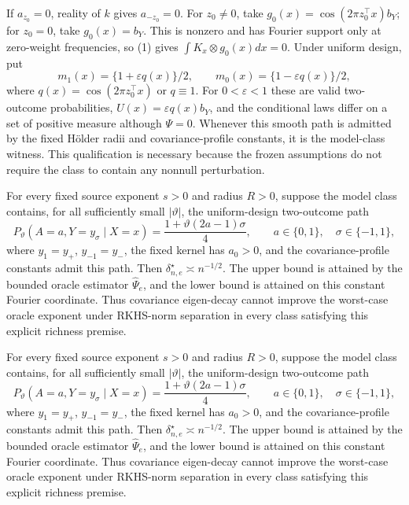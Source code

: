 If \(a_{z_0}=0\), reality of \(k\) gives \(a_{-z_0}=0\). For \(z_0\ne0\), take \(g_0(x)=\cos(2\pi z_0^\top x)b_Y\); for \(z_0=0\), take \(g_0(x)=b_Y\). This is nonzero and has Fourier support only at zero-weight frequencies, so (1) gives \(\int K_x\otimes g_0(x)dx=0\). Under uniform design, put
\[
m_1(x)=\{1+\varepsilon q(x)\}/2,\qquad
m_0(x)=\{1-\varepsilon q(x)\}/2,
\]
where \(q(x)=\cos(2\pi z_0^\top x)\) or \(q\equiv1\). For \(0<\varepsilon<1\) these are valid two-outcome probabilities, \(U(x)=\varepsilon q(x)b_Y\), and the conditional laws differ on a set of positive measure although \(\Psi=0\). Whenever this smooth path is admitted by the fixed Hölder radii and covariance-profile constants, it is the model-class witness. This qualification is necessary because the frozen assumptions do not require the class to contain any nonnull perturbation.

For every fixed source exponent \(s>0\) and radius \(R>0\), suppose the model class contains, for all sufficiently small \(|\vartheta|\), the uniform-design two-outcome path
\[
P_\vartheta(A=a,Y=y_\sigma\mid X=x)
=\frac{1+\vartheta(2a-1)\sigma}{4},
\qquad a\in\{0,1\},\quad \sigma\in\{-1,1\},
\]
where \(y_1=y_+\), \(y_{-1}=y_-\), the fixed kernel has \(a_0>0\), and the covariance-profile constants admit this path. Then \(\delta_{n,e}^\star\asymp n^{-1/2}\). The upper bound is attained by the bounded oracle estimator \(\widehat\Psi_e\), and the lower bound is attained on this constant Fourier coordinate. Thus covariance eigen-decay cannot improve the worst-case oracle exponent under RKHS-norm separation in every class satisfying this explicit richness premise.

For every fixed source exponent \(s>0\) and radius \(R>0\), suppose the model class contains, for all sufficiently small \(|\vartheta|\), the uniform-design two-outcome path
\[
P_\vartheta(A=a,Y=y_\sigma\mid X=x)
=\frac{1+\vartheta(2a-1)\sigma}{4},
\qquad a\in\{0,1\},\quad \sigma\in\{-1,1\},
\]
where \(y_1=y_+\), \(y_{-1}=y_-\), the fixed kernel has \(a_0>0\), and the covariance-profile constants admit this path. Then \(\delta_{n,e}^\star\asymp n^{-1/2}\). The upper bound is attained by the bounded oracle estimator \(\widehat\Psi_e\), and the lower bound is attained on this constant Fourier coordinate. Thus covariance eigen-decay cannot improve the worst-case oracle exponent under RKHS-norm separation in every class satisfying this explicit richness premise.

